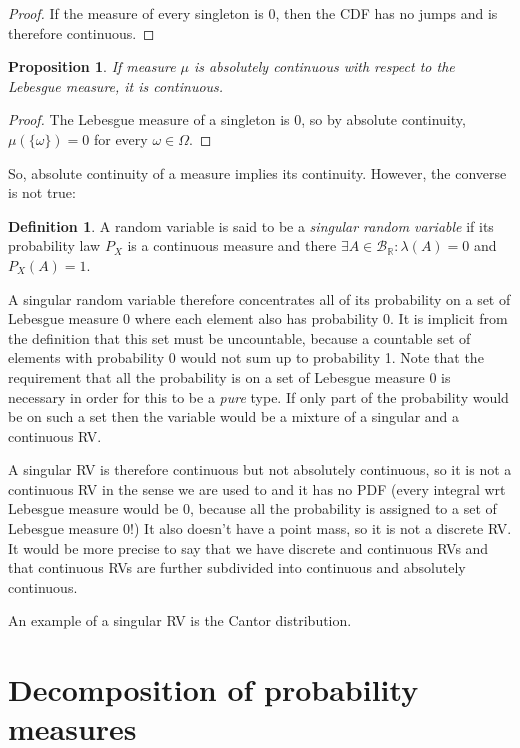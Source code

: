\documentclass{book}
\theoremstyle{plain}%
\newtheorem{proposition}{Proposition}[section]
\theoremstyle{definition}
\newtheorem{definition}{Definition}[section]
\begin{document}
\begin{proof}
If the measure of every singleton is 0, then the CDF has no jumps and is therefore continuous.
\end{proof}

\begin{proposition}
If measure $\mu$ is absolutely continuous with respect to the Lebesgue measure, it is continuous.
\end{proposition}

\begin{proof}
The Lebesgue measure of a singleton is 0, so by absolute continuity, $\mu(\{\omega\}) = 0$ for every $\omega \in \Omega$.
\end{proof}

So, absolute continuity of a measure implies its continuity. However, the converse is not true:

\begin{definition}
A random variable is said to be a \emph{singular random variable} if its probability law $P_X$ is a continuous measure and there $\exists A\in \mathcal{B}_\mathbb{R}: \lambda(A) = 0$ and $P_X(A) = 1$.
\end{definition}

A singular random variable therefore concentrates all of its probability on a set of Lebesgue measure 0 where each element also has probability 0. It is implicit from the definition that this set must be uncountable, because a countable set of elements with probability 0 would not sum up to probability 1. Note that the requirement that all the probability is on a set of Lebesgue measure 0 is necessary in order for this to be a \emph{pure} type. If only part of the probability would be on such a set then the variable would be a mixture of a singular and a continuous RV.

A singular RV is therefore continuous but not absolutely continuous, so it is not a continuous RV in the sense we are used to and it has no PDF (every integral wrt Lebesgue measure would be 0, because all the probability is assigned to a set of Lebesgue measure 0!) It also doesn't have a point mass, so it is not a discrete RV. It would be more precise to say that we have discrete and continuous RVs and that continuous RVs are further subdivided into continuous and absolutely continuous.

An example of a singular RV is the Cantor distribution.

\section{Decomposition of probability measures}
\end{document}

